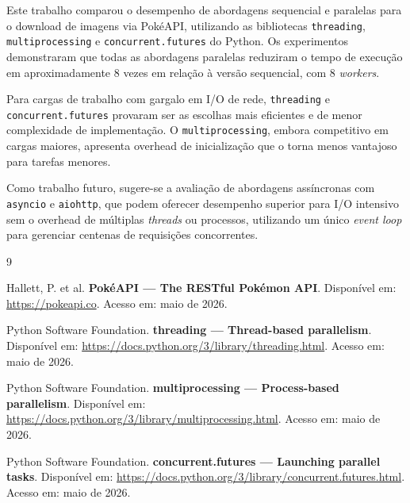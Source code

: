 \documentclass[12pt]{article}
\begin{document}
Este trabalho comparou o desempenho de abordagens sequencial e paralelas para o
download de imagens via PokéAPI, utilizando as bibliotecas \texttt{threading},
\texttt{multiprocessing} e \texttt{concurrent.futures} do Python. Os experimentos
demonstraram que todas as abordagens paralelas reduziram o tempo de execução em
aproximadamente 8 vezes em relação à versão sequencial, com 8 \textit{workers}.

Para cargas de trabalho com gargalo em I/O de rede, \texttt{threading} e
\texttt{concurrent.futures} provaram ser as escolhas mais eficientes e de menor
complexidade de implementação. O \texttt{multiprocessing}, embora competitivo em
cargas maiores, apresenta overhead de inicialização que o torna menos vantajoso
para tarefas menores.

Como trabalho futuro, sugere-se a avaliação de abordagens assíncronas com
\texttt{asyncio} e \texttt{aiohttp}, que podem oferecer desempenho superior para
I/O intensivo sem o overhead de múltiplas \textit{threads} ou processos,
utilizando um único \textit{event loop} para gerenciar centenas de requisições
concorrentes.



\begin{thebibliography}{9}

  Hallett, P. et al.
  \textbf{PokéAPI — The RESTful Pokémon API}.
  Disponível em: \url{https://pokeapi.co}.
  Acesso em: maio de 2026.

  Python Software Foundation.
  \textbf{threading — Thread-based parallelism}.
  Disponível em: \url{https://docs.python.org/3/library/threading.html}.
  Acesso em: maio de 2026.

  Python Software Foundation.
  \textbf{multiprocessing — Process-based parallelism}.
  Disponível em: \url{https://docs.python.org/3/library/multiprocessing.html}.
  Acesso em: maio de 2026.

  Python Software Foundation.
  \textbf{concurrent.futures — Launching parallel tasks}.
  Disponível em: \url{https://docs.python.org/3/library/concurrent.futures.html}.
  Acesso em: maio de 2026.

\end{thebibliography}
\end{document}
